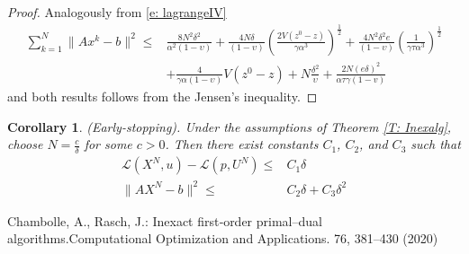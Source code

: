 \documentclass[11pt]{report}
\newtheorem{corollary}[theorem]{Corollary}
\theoremstyle{plain}{\theorembodyfont{\rmfamily}%
\newtheorem{assumption}[theorem]{Assumption}}
\theoremstyle{plain}{\theorembodyfont{\rmfamily}%
\newtheorem{algorithm}[theorem]{Algorithm}}
\theoremstyle{plain}{\theorembodyfont{\rmfamily}%
\newtheorem{example}[theorem]{Example}}
\theoremstyle{plain}{\theorembodyfont{\rmfamily}%
\newtheorem{remark}[theorem]{Remark}}
\theoremstyle{plain}{\theorembodyfont{\rmfamily}%
\newtheorem{definition}[theorem]{Definition}}
\theoremstyle{plain}{\theorembodyfont{\rmfamily}%
\newtheorem{problem}[theorem]{Problem}}
\numberwithin{equation}{chapter}
\newcommand{\dal}{u}
\newcommand{\prim}{x}
\newcommand{\proj}{p}
\newcommand{\Dal}{U}
\newcommand{\Prim}{X}
\begin{document}
\begin{proof}
    Analogously from \eqref{e: lagrangeIV}
    \begin{align}
         \sum_{k=1}^{N}\|A\prim^k-b\|^2\leq&\frac{8N^2\delta^2}{\alpha^{2}(1-\upsilon)}+\frac{4N\delta}{(1-\upsilon)}\left(\frac{2 V(z^{0}-z)}{\gamma\alpha^3}\right)^{\frac{1}{2}}+\frac{4N^2\delta^2e}{(1-\upsilon)}\left(\frac{ 1}{\gamma\tau\alpha^3}\right)^{\frac{1}{2}}\nonumber\\&+\frac{4}{\gamma\alpha(1-\upsilon)}V(z^{0}-z)+N\frac{\delta^2}{\upsilon}+\frac{2N(e\delta)^2}{\alpha\tau\gamma(1-v)}
    \end{align}
    and both results follows from the Jensen's inequality.
\end{proof}
\begin{corollary} (Early-stopping). Under the assumptions of Theorem \ref{T:  Inexalg}, choose $N=\frac{c}{\delta}$ for some $c>0$. Then there exist constants $C_1$, $C_2$, and $C_3$ such that
 \begin{align}
    \mathcal{L}\left(\Prim^{N},\dal\right)- \mathcal{L}\left(\proj,\Dal^{N}\right)\leq&   C_1\delta\nonumber\\
        \|A\Prim^N-b\|^2\leq& C_2\delta+ C_3\delta^2
    \end{align}

\end{corollary}
\begin{thebibliography}{99}
\setlength{\itemsep}{1pt}
 Chambolle, A., Rasch, J.: Inexact first‑order primal–dual algorithms.Computational Optimization and Applications. {76}, 381–430 (2020)
\end{thebibliography}
\end{document}
